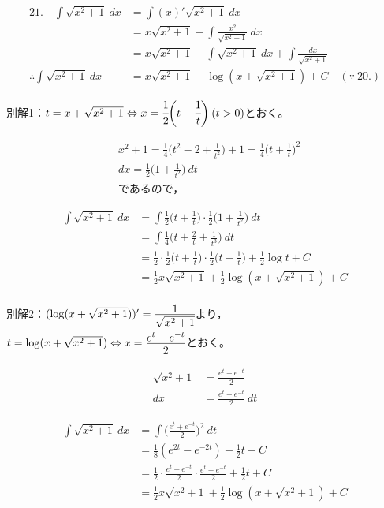 \documentclass[autodetect-engine,ja=standard, 10.5pt, a4paper, titlepage]{bxjsarticle}
\numberwithin{equation}{section} %
\begin{document}
  \begin{fleqn}[0pt]
    \begin{align*}
      21.\quad \int \sqrt{x^2 + 1} \:dx
      &= \int (x)'\sqrt{x^2+1}\:dx \\
      &= x\sqrt{x^2 + 1} - \int \frac{x^2}{\sqrt{x^2+1}}\:dx \\
      &= x\sqrt{x^2 + 1} - \int \sqrt{x^2 + 1} \:dx + \int \frac{dx}{\sqrt{x^2 + 1}} \\
      \therefore \int \sqrt{x^2 + 1} \:dx 
      &= x\sqrt{x^2 + 1} + \log(x + \sqrt{x^2 + 1}) + C \quad(\because \:20.)
    \end{align*}
  \end{fleqn}
別解1：$t = x + \sqrt{x^2 + 1}\Leftrightarrow x = \cfrac{1}{2}\biggl(t-\cfrac{1}{t}\biggr)\:(t>0)$とおく。
  \begin{fleqn}[25pt]
    \begin{align*}
      &x^2 + 1 = \frac{1}{4}\biggl(t^2 - 2 + \frac{1}{t^2}\biggr) + 1 = \frac{1}{4}\biggl(t+\frac{1}{t}\biggr)^2 \\
      &dx = \frac{1}{2}\biggl(1+\frac{1}{t^2}\biggr)\:dt \\
      &\text{であるので，}
    \end{align*}
  \end{fleqn}
  \begin{fleqn}[25pt]
    \begin{align*}
      \int \sqrt{x^2 + 1}\:dx
      &= \int \frac{1}{2}\biggl(t+\frac{1}{t}\biggr)\cdot \frac{1}{2}\biggl(1+\frac{1}{t^2}\biggr)\:dt \\
      &= \int \frac{1}{4}\biggl(t+\frac{2}{t}+\frac{1}{t^3}\biggr)\:dt \\
      &= \frac{1}{2}\cdot\frac{1}{2}\biggl(t+\frac{1}{t}\biggr)\cdot\frac{1}{2}\biggl(t-\frac{1}{t}\biggr)+\frac{1}{2}\log t + C \\
      &= \frac{1}{2}x\sqrt{x^2+1} + \frac{1}{2}\log(x+\sqrt{x^2+1}) + C
    \end{align*}
  \end{fleqn}
別解2：$(\log(x+\sqrt{x^2+1}))'=\cfrac{\raisebox{-3pt}{1}}{\sqrt{x^2 + 1}}$より，$t=\log(x+\sqrt{x^2+1})\Leftrightarrow x = \cfrac{\raisebox{-3pt}{$e^t-e^{-t}$}}{2}$とおく。
  \begin{fleqn}[25pt]
    \begin{align*}
      \sqrt{x^2 + 1} &= \frac{e^t+e^{-t}}{2} \\
      dx &= \frac{e^t+e^{-t}}{2}\:dt
    \end{align*}
  \end{fleqn}
  \begin{fleqn}[25pt]
    \begin{align*}
      \int \sqrt{x^2 + 1}\:dx
      &= \int \biggl(\frac{e^t+e^{-t}}{2}\biggr)^2\:dt \\
      &= \frac{1}{8}(e^{2t}-e^{-2t}) + \frac{1}{2}t + C \\
      &= \frac{1}{2}\cdot \frac{e^t+e^{-t}}{2}\cdot\frac{e^t-e^{-t}}{2} + \frac{1}{2}t + C \\
      &= \frac{1}{2}x\sqrt{x^2+1} + \frac{1}{2}\log(x+\sqrt{x^2+1}) + C
    \end{align*}
  \end{fleqn}
\end{document}
